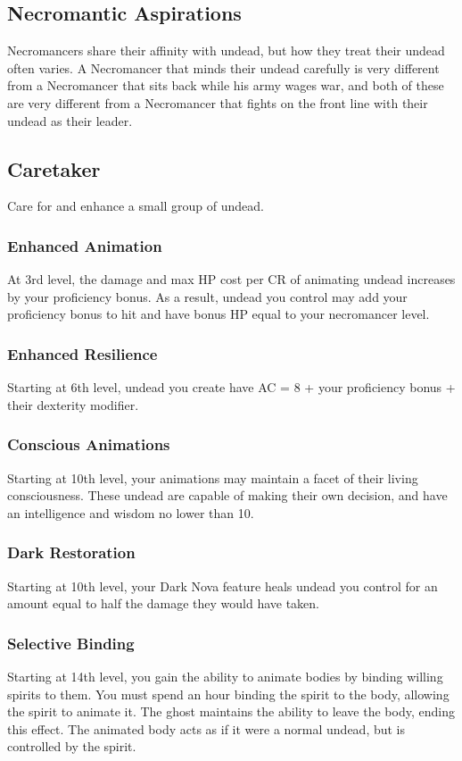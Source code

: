 \documentclass[10pt,twoside,twocolumn,openany]{book}
\begin{document}
\subsection{Necromantic Aspirations}
Necromancers share their affinity with undead, but how they treat their undead often varies. A Necromancer that minds their undead carefully is very different from a Necromancer that sits back while his army wages war, and both of these are very different from a Necromancer that fights on the front line with their undead as their leader.

\subsection{Caretaker}
Care for and enhance a small group of undead.

\subsubsection{Enhanced Animation}
At 3rd level, the damage and max HP cost per CR of animating undead increases by your proficiency bonus. As a result, undead you control may add your proficiency bonus to hit and have bonus HP equal to your necromancer level.

\subsubsection{Enhanced Resilience}
Starting at 6th level, undead you create have AC = 8 + your proficiency bonus + their dexterity modifier.

\subsubsection{Conscious Animations}
Starting at 10th level, your animations may maintain a facet of their living consciousness. These undead are capable of making their own decision, and have an intelligence and wisdom no lower than 10.

\subsubsection{Dark Restoration}
Starting at 10th level, your Dark Nova feature heals undead you control for an amount equal to half the damage they would have taken.

\subsubsection{Selective Binding}
Starting at 14th level, you gain the ability to animate bodies by binding willing spirits to them. You must spend an hour binding the spirit to the body, allowing the spirit to animate it. The ghost maintains the ability to leave the body, ending this effect. The animated body acts as if it were a normal undead, but is controlled by the spirit.
\end{document}
